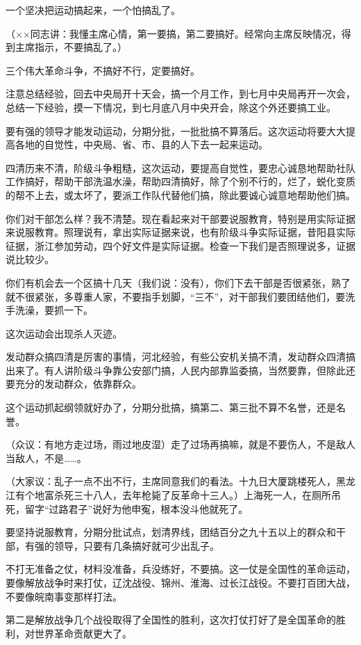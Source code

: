 一个坚决把运动搞起来，一个怕搞乱了。

（××同志讲：我懂主席心情，第一要搞，第二要搞好。经常向主席反映情况，得到主席指示，不要搞乱了。）

三个伟大革命斗争，不搞好不行，定要搞好。

注意总结经验，回去中央局开十天会，搞一个月工作，到七月中央局再开一次会，总结一下经验，摸一下情况，到七月底八月中央开会，除这个外还要搞工业。

要有强的领导才能发动运动，分期分批，一批批搞不算落后。这次运动将要大大提高各地的自觉性，中央局、省、市、县的人下去一起来运动。

四清历来不清，阶级斗争粗糙，这次运动，要提高自觉性，要忠心诚恳地帮助社队工作搞好，帮助干部洗温水澡，帮助四清搞好，除了个别不行的，烂了，蜕化变质的帮不上去，或太坏了，要派工作队代替他们搞，除此要诚心诚意地帮助他们搞。

你们对干部怎么样？我不清楚。现在看起来对干部要说服教育，特别是用实际证据来说服教育。照理说有，拿出实际证据来说，也有阶级斗争实际证据，昔阳县实际征据，浙江参加劳动，四个好文件是实际证据。检查一下我们是否照理说多，证据说比较少。

你们有机会去一个区搞十几天（我们说：没有），你们下去干部是否很紧张，熟了就不很紧张，多尊重人家，不要指手划脚，“三不”，对干部我们要团结他们，要洗手洗澡，要抓一下。

这次运动会出现杀人灭迹。

发动群众搞四清是厉害的事情，河北经验，有些公安机关搞不清，发动群众四清搞出来了。有人讲阶级斗争靠公安部门搞，人民内部靠监委搞，当然要靠，但除此还要充分的发动群众，依靠群众。

这个运动抓起纲领就好办了，分期分批搞，搞第二、第三批不算不名誉，还是名誉。

（众议：有地方走过场，雨过地皮湿）走了过场再搞嘛，就是不要伤人，不是敌人当敌人，不是……。

（大家议：乱子一点不出不行，主席同意我们的看法。十九日大厦跳楼死人，黑龙江有个地富杀死三十八人，去年枪毙了反革命十三人。）上海死一人，在厕所吊死，留字“过路君子”说好为他申寃，根本没斗他就死了。

要坚持说服教育，分期分批试点，划清界线，团结百分之九十五以上的群众和干部，有强的领导，只要有几条搞好就可少出乱子。

不打无准备之仗，材料没准备，兵没练好，不要搞。这一仗是全国性的革命运动，要像解放战争时来打仗，辽沈战役、锦州、淮海、过长江战役。不要打百团大战，不要像皖南事变那样打法。

第二是解放战争几个战役取得了全国性的胜利，这次打仗打好了是全国革命的胜利，对世界革命贡献更大了。


